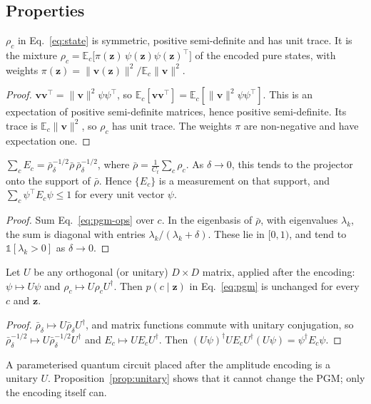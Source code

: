\subsection{Properties}
\label{sec:properties}

\begin{proposition}\label{prop:state}
$\rho_c$ in Eq.~\eqref{eq:state} is symmetric, positive semi-definite and has
unit trace. It is the mixture $\rho_c=\mathbb E_c\big[\pi(\mathbf z)\,\psi(\mathbf z)\psi(\mathbf z)^{\top}\big]$
of the encoded pure states, with weights
$\pi(\mathbf z)=\|\mathbf v(\mathbf z)\|^2/\mathbb E_c\|\mathbf v\|^2$.
\end{proposition}
\begin{proof}
$\mathbf v\mathbf v^{\top}=\|\mathbf v\|^2\psi\psi^{\top}$, so
$\mathbb E_c[\mathbf v\mathbf v^{\top}]=\mathbb E_c[\|\mathbf v\|^2\psi\psi^{\top}]$. This
is an expectation of positive semi-definite matrices, hence positive
semi-definite. Its trace is $\mathbb E_c\|\mathbf v\|^2$, so $\rho_c$ has unit
trace. The weights $\pi$ are non-negative and have expectation one.
\end{proof}

\begin{proposition}[completeness]\label{prop:povm}
$\sum_c E_c=\bar\rho_\delta^{-1/2}\bar\rho\,\bar\rho_\delta^{-1/2}$, where
$\bar\rho=\frac1{C_t}\sum_c\rho_c$. As $\delta\to0$, this tends to the projector
onto the support of $\bar\rho$. Hence $\{E_c\}$ is a measurement on that
support, and $\sum_c\psi^{\top}E_c\psi\le1$ for every unit vector $\psi$.
\end{proposition}
\begin{proof}
Sum Eq.~\eqref{eq:pgm-ops} over $c$. In the eigenbasis of $\bar\rho$, with
eigenvalues $\lambda_k$, the sum is diagonal with entries
$\lambda_k/(\lambda_k+\delta)$. These lie in $[0,1)$, and tend to
$\mathbb 1[\lambda_k>0]$ as $\delta\to0$.
\end{proof}

\begin{proposition}\label{prop:unitary}
Let $U$ be any orthogonal (or unitary) $D\times D$ matrix, applied after the
encoding: $\psi\mapsto U\psi$ and $\rho_c\mapsto U\rho_cU^{\dagger}$. Then
$p(c\mid\mathbf z)$ in Eq.~\eqref{eq:pgm} is unchanged for every $c$ and $\mathbf z$.
\end{proposition}
\begin{proof}
$\bar\rho_\delta\mapsto U\bar\rho_\delta U^{\dagger}$, and matrix functions commute
with unitary conjugation, so $\bar\rho_\delta^{-1/2}\mapsto U\bar\rho_\delta^{-1/2}U^{\dagger}$
and $E_c\mapsto UE_cU^{\dagger}$. Then
$(U\psi)^{\dagger}UE_cU^{\dagger}(U\psi)=\psi^{\dagger}E_c\psi$.
\end{proof}
\noindent A parameterised quantum circuit placed after the amplitude encoding is a
unitary $U$. Proposition~\ref{prop:unitary} shows that it cannot change the
PGM; only the encoding itself can.

